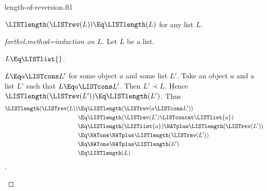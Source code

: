 \documentclass{stex}
\begin{document}
\begin{smodule}{length-of-reversion.ftl}

\begin{proposition}[forthel]
  $\LISTlength(\LISTrev(L)) \Eq \LISTlength(L)$ for any list $L$.
\end{proposition}
\begin{proof}[forthel,method=induction on $L$]
  Let $L$ be a list.
  
  \begin{case}{$L \Eq \LISTlist{}$.}\end{case}
  
  \begin{case}{$L \Eq a \LISTcons L'$ for some object $a$ and some list $L'$.}
    Take an object $a$ and a list $L'$ such that $L \Eq a \LISTcons L'$.
    Then $L' \prec L$.
    Hence $\LISTlength(\LISTrev(L')) \Eq \LISTlength(L')$.
    Thus
    \begin{align*}
      \LISTlength(\LISTrev(L))
        &\Eq \LISTlength(\LISTrev(a \LISTcons L'))\\
        &\Eq \LISTlength(\LISTrev(L') \LISTconcat \LISTlist{a})\\
        &\Eq \LISTlength(\LISTlist{a}) \NATplus \LISTlength(\LISTrev(L'))\\
        &\Eq \NATone \NATplus \LISTlength(\LISTrev(L'))\\
        &\Eq \NATone \NATplus \LISTlength(L')\\
        &\Eq \LISTlength(L)
    \end{align*}.
  \end{case}
\end{proof}
\end{smodule}
\end{document}
